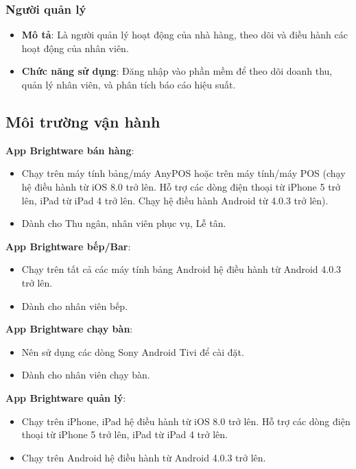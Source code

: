 \subsubsection{Người quản lý}
\begin{itemize}[leftmargin=1.5cm, label={--}]
    \item \textbf{Mô tả}: Là người quản lý hoạt động của nhà hàng, theo dõi và điều hành các hoạt động của nhân viên.
    \item \textbf{Chức năng sử dụng}: Đăng nhập vào phần mềm để theo dõi doanh thu, quản lý nhân viên, và phân tích báo cáo hiệu suất.
\end{itemize}


\subsection{Môi trường vận hành}
\vspace{0.5em}
\textbf{App Brightware bán hàng}: 
\begin{itemize}[leftmargin=1.5cm, label={--}]
    \item Chạy trên máy tính bảng/máy AnyPOS hoặc trên máy tính/máy POS (chạy hệ điều hành từ iOS 8.0 trở lên. Hỗ trợ các dòng điện thoại từ iPhone 5 trở lên, iPad từ iPad 4 trở lên. Chạy hệ điều hành Android từ 4.0.3 trở lên).
    \item Dành cho Thu ngân, nhân viên phục vụ, Lễ tân.
\end{itemize}

\textbf{App Brightware bếp/Bar}: 
\begin{itemize}[leftmargin=1.5cm, label={--}]
    \item Chạy trên tất cả các máy tính bảng Android hệ điều hành từ Android 4.0.3 trở lên.
    \item Dành cho nhân viên bếp.
\end{itemize}

\textbf{App Brightware chạy bàn}: 
\begin{itemize}[leftmargin=1.5cm, label={--}]
    \item Nên sử dụng các dòng Sony Android Tivi để cài đặt.
    \item Dành cho nhân viên chạy bàn.
\end{itemize}

\textbf{App Brightware quản lý}: 
\begin{itemize}[leftmargin=1.5cm, label={--}]
    \item Chạy trên iPhone, iPad hệ điều hành từ iOS 8.0 trở lên. Hỗ trợ các dòng điện thoại từ iPhone 5 trở lên, iPad từ iPad 4 trở lên.
    \item Chạy trên Android hệ điều hành từ Android 4.0.3 trở lên.
\end{itemize}

